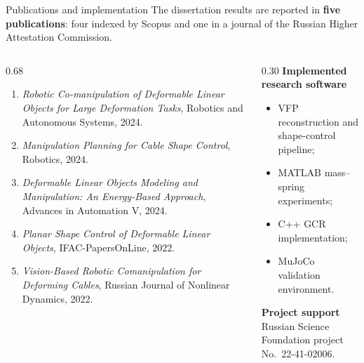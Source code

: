 \documentclass[aspectratio=169,10pt]{beamer}
\begin{document}
\begin{frame}[t]{Publications and implementation}
  \small
  The dissertation results are reported in \textbf{five publications}:
  four indexed by Scopus and one in a journal of the Russian Higher
  Attestation Commission.

  \vspace{0.16cm}
  \begin{columns}[T,onlytextwidth]
    \begin{column}{0.68\textwidth}
      \footnotesize
      \begin{enumerate}
        \item \emph{Robotic Co-manipulation of Deformable Linear Objects for
          Large Deformation Tasks}, Robotics and Autonomous Systems, 2024.
        \item \emph{Manipulation Planning for Cable Shape Control},
          Robotics, 2024.
        \item \emph{Deformable Linear Objects Modeling and Manipulation:
          An Energy-Based Approach}, Advances in Automation V, 2024.
        \item \emph{Planar Shape Control of Deformable Linear Objects},
          IFAC-PapersOnLine, 2022.
        \item \emph{Vision-Based Robotic Comanipulation for Deforming Cables},
          Russian Journal of Nonlinear Dynamics, 2022.
      \end{enumerate}
    \end{column}
    \begin{column}{0.30\textwidth}
      \footnotesize
      \textbf{Implemented research software}
      \begin{itemize}
        \item VFP reconstruction and shape-control pipeline;
        \item MATLAB mass--spring experiments;
        \item C++ GCR implementation;
        \item MuJoCo validation environment.
      \end{itemize}

      \vspace{0.12cm}
      \textbf{Project support}\\
      Russian Science Foundation project No.~22-41-02006.
    \end{column}
  \end{columns}

\end{frame}
\end{document}
